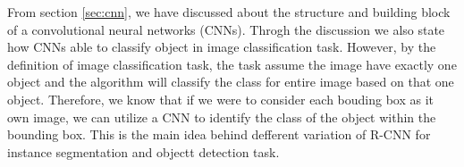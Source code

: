 From section \ref{sec:cnn}, we have discussed about the structure and building
block of a convolutional neural networks (CNNs). Throgh the discussion we also
state how CNNs able to classify object in image classification task. However,
by the definition of image classification task, the task assume the image have
exactly one object and the algorithm will classify the class for entire image
based on that one object. Therefore, we know that if we were to consider each
bouding box as it own image, we can utilize a CNN to identify the class of the
object within the bounding box. This is the main idea behind defferent
variation of R-CNN for instance segmentation and objectt detection task. 